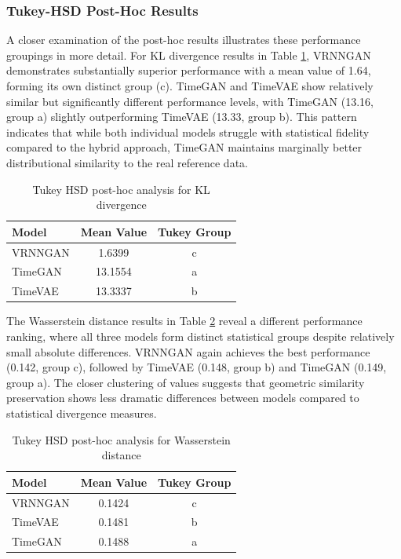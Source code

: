 \documentclass[11pt]{article}
\begin{document}
\subsubsection{Tukey-HSD Post-Hoc Results}

A closer examination of the post-hoc results illustrates these performance groupings in more detail. For KL divergence results in Table \ref{tab:tukey_kl}, VRNNGAN demonstrates substantially superior performance with a mean value of 1.64, forming its own distinct group (c). TimeGAN and TimeVAE show relatively similar but significantly different performance levels, with TimeGAN (13.16, group a) slightly outperforming TimeVAE (13.33, group b). This pattern indicates that while both individual models struggle with statistical fidelity compared to the hybrid approach, TimeGAN maintains marginally better distributional similarity to the real reference data.

\begin{table}[H]
\centering
\caption{Tukey HSD post-hoc analysis for KL divergence}
\label{tab:tukey_kl}
\begin{tabular}{lcc}
\toprule
\textbf{Model} & \textbf{Mean Value} & \textbf{Tukey Group} \\
\midrule
VRNNGAN & 1.6399 & c \\
TimeGAN & 13.1554 & a \\
TimeVAE & 13.3337 & b \\
\bottomrule
\end{tabular}
\footnotesize
\end{table}

The Wasserstein distance results in Table \ref{tab:tukey_wasserstein} reveal a different performance ranking, where all three models form distinct statistical groups despite relatively small absolute differences. VRNNGAN again achieves the best performance (0.142, group c), followed by TimeVAE (0.148, group b) and TimeGAN (0.149, group a). The closer clustering of values suggests that geometric similarity preservation shows less dramatic differences between models compared to statistical divergence measures.

\begin{table}[H]
\centering
\caption{Tukey HSD post-hoc analysis for Wasserstein distance}
\label{tab:tukey_wasserstein}
\begin{tabular}{lcc}
\toprule
\textbf{Model} & \textbf{Mean Value} & \textbf{Tukey Group} \\
\midrule
VRNNGAN & 0.1424 & c \\
TimeVAE & 0.1481 & b \\
TimeGAN & 0.1488 & a \\
\bottomrule
\end{tabular}
\footnotesize
\end{table}
\end{document}
